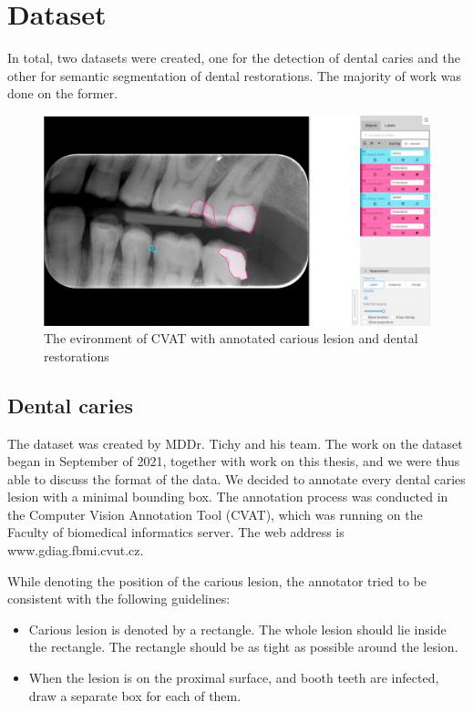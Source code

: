 \chapter{Dataset}
In total, two datasets were created, one for the detection of dental caries and the other for semantic segmentation of dental restorations. The majority of work was done on the former.

\begin{figure}
    \centering
    \includegraphics[width=\linewidth]{images/cvat.png}
    \caption{The evironment of CVAT with annotated carious lesion and dental restorations}
    \label{fig:cvat}
\end{figure}

\section{Dental caries}
The dataset was created by MDDr. Tichy and his team. The work on the dataset began in September of 2021, together with work on this thesis, and we were thus able to discuss the format of the data. We decided to annotate every dental caries lesion with a minimal bounding box. The annotation process was conducted in the Computer Vision Annotation Tool (CVAT), which was running on the Faculty of biomedical informatics server. The web address is www.gdiag.fbmi.cvut.cz.

While denoting the position of the carious lesion, the annotator tried to be consistent with the following guidelines:

\begin{itemize}
    \item Carious lesion is denoted by a rectangle. The whole lesion should lie inside the rectangle. The rectangle should be as tight as possible around the lesion.
    \item When the lesion is on the proximal surface, and booth teeth are infected, draw a separate box for each of them.
\end{itemize}

